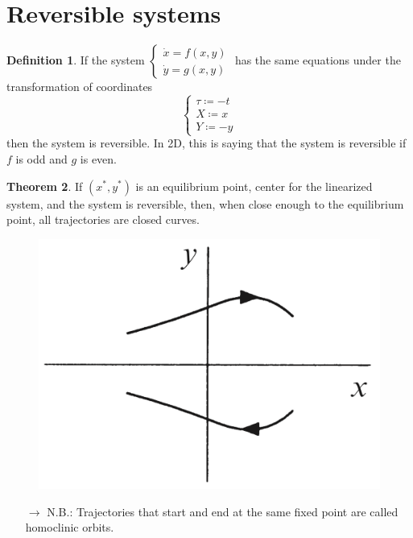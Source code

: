 \documentclass[12pt, openany]{report}
\theoremstyle{definition}
\newtheorem{thm}{Theorem}[chapter]
\newtheorem{definition}[thm]{Definition}
\begin{document}
\section{Reversible systems}
\begin{definition}
    If the system \(\begin{cases} \dot x =f(x,y)\\ \dot y=g(x,y) \end{cases}\) has the same equations under the transformation of coordinates 
    \begin{equation}
        \begin{cases}
            \tau \coloneqq -t\\
            X \coloneqq x\\
            Y \coloneqq -y
        \end{cases}
    \end{equation}
    then the system is reversible. In 2D, this is saying that the system is reversible if \(f\) is odd and \(g\) is even. 
\end{definition}
\begin{thm}
    If \((x^*,y^*)\) is an equilibrium point, center for the linearized system, and the system is reversible, then, when close enough to the equilibrium point, all trajectories are closed curves.
\end{thm}
\begin{figure}[H]
    \centering
    \includegraphics[width = .3\textwidth]{img/reversible.png}
\end{figure}
\begin{itemize}
    \item [\(\rightarrow\)] N.B.: Trajectories that start and end at the same fixed point are called homoclinic orbits. 
\end{itemize}
\end{document}

